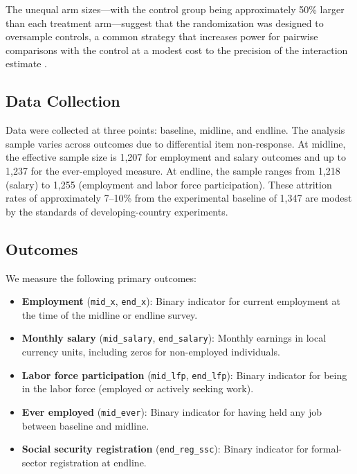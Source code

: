 \documentclass[12pt]{article}
\begin{document}
The unequal arm sizes---with the control group being approximately 50\% larger than each treatment arm---suggest that the randomization was designed to oversample controls, a common strategy that increases power for pairwise comparisons with the control at a modest cost to the precision of the interaction estimate \citep{duflo2007using}.

\subsection{Data Collection}

Data were collected at three points: baseline, midline, and endline. The analysis sample varies across outcomes due to differential item non-response. At midline, the effective sample size is 1,207 for employment and salary outcomes and up to 1,237 for the ever-employed measure. At endline, the sample ranges from 1,218 (salary) to 1,255 (employment and labor force participation). These attrition rates of approximately 7--10\% from the experimental baseline of 1,347 are modest by the standards of developing-country experiments.

\subsection{Outcomes}

We measure the following primary outcomes:

\begin{itemize}[leftmargin=2cm]
    \item \textbf{Employment} (\texttt{mid\_x}, \texttt{end\_x}): Binary indicator for current employment at the time of the midline or endline survey.
    \item \textbf{Monthly salary} (\texttt{mid\_salary}, \texttt{end\_salary}): Monthly earnings in local currency units, including zeros for non-employed individuals.
    \item \textbf{Labor force participation} (\texttt{mid\_lfp}, \texttt{end\_lfp}): Binary indicator for being in the labor force (employed or actively seeking work).
    \item \textbf{Ever employed} (\texttt{mid\_ever}): Binary indicator for having held any job between baseline and midline.
    \item \textbf{Social security registration} (\texttt{end\_reg\_ssc}): Binary indicator for formal-sector registration at endline.
\end{itemize}
\end{document}
